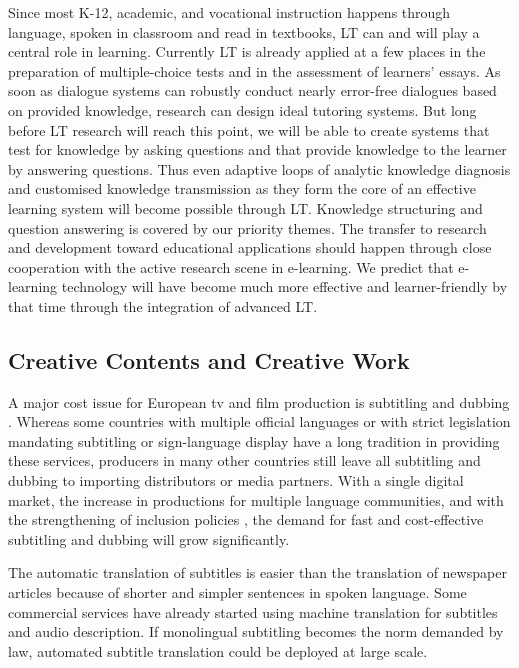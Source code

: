 \documentclass[10pt, plain]{../../metanetpaper}
\begin{document}
\begin{multicols}{2}
Since most K-12, academic, and vocational instruction happens through language, spoken in classroom and read in textbooks, LT can and will play a central role in learning. Currently LT is already applied at a few places in the preparation of multiple-choice tests and in the assessment of learners’ essays. As soon as dialogue systems can robustly conduct nearly error-free dialogues based on provided knowledge, research can design ideal tutoring systems. But long before LT research will reach this point, we will be able to create systems that test for knowledge by asking questions and that provide knowledge to the learner by answering questions. Thus even adaptive loops of analytic knowledge diagnosis and customised knowledge transmission as they form the core of an effective learning system will become possible through LT. Knowledge structuring and question answering is covered by our priority themes. The transfer to research and development toward educational applications should happen through close cooperation with the active research scene in e-learning. We predict that e-learning technology will have become much more effective and learner-friendly by that time through the integration of advanced LT.

\subsection{Creative Contents and Creative Work}
\label{sec:lt-creative-contents}

A major cost issue for European tv and film production is subtitling and dubbing \cite{eurobarometer2011}. Whereas some countries with multiple official languages or with strict legislation mandating subtitling or sign-language display have a long tradition in providing these services, producers in many other countries still leave all subtitling and dubbing to importing distributors or media partners. With a single digital market, the increase in productions for multiple language communities, and with the strengthening of inclusion policies \cite{medier12}, the demand for fast and cost-effective subtitling and dubbing will grow significantly.

The automatic translation of subtitles is easier than the translation of newspaper articles because of shorter and simpler sentences in spoken language. Some commercial services have already started using machine translation for subtitles and audio description. If monolingual subtitling becomes the norm demanded by law, automated subtitle translation could be deployed at large scale.
 

\end{multicols}
\end{document}
